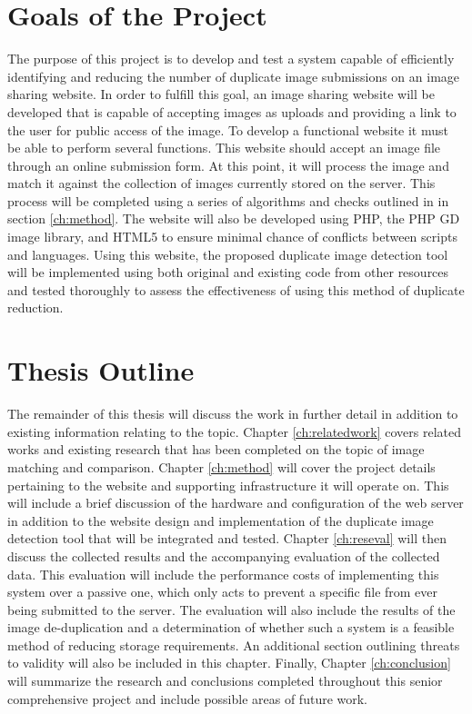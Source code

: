 \section{Goals of the Project}\label{sec:goals}
The purpose of this project is to develop and test a system capable of efficiently identifying and reducing the number of duplicate image submissions on an image sharing website. In order to fulfill this goal, an image sharing website will be developed that is capable of accepting images as uploads and providing a link to the user for public access of the image. To develop a functional website it must be able to perform several functions. This website should accept an image file through an online submission form. At this point, it will process the image and match it against the collection of images currently stored on the server. This process will be completed using a series of algorithms and checks outlined in in section \ref{ch:method}. The website will also be developed using PHP, the PHP GD image library, and HTML5 to ensure minimal chance of conflicts between scripts and languages. Using this website, the proposed duplicate image detection tool will be implemented using both original and existing code from other resources and tested thoroughly to assess the effectiveness of using this method of duplicate reduction.

\section{Thesis Outline}\label{sec:outline}
The remainder of this thesis will discuss the work in further detail in addition to existing information relating to the topic. Chapter \ref{ch:relatedwork} covers related works and existing research that has been completed on the topic of image matching and comparison. Chapter \ref{ch:method} will cover the project details pertaining to the website and supporting infrastructure it will operate on. This will include a brief discussion of the hardware and configuration of the web server in addition to the website design and implementation of the duplicate image detection tool that will be integrated and tested. Chapter \ref{ch:reseval} will then discuss the collected results and the accompanying evaluation of the collected data. This evaluation will include the performance costs of implementing this system over a passive one, which only acts to prevent a specific file from ever being submitted to the server. The evaluation will also include the results of the image de-duplication and a determination of whether such a system is a feasible method of reducing storage requirements. An additional section outlining threats to validity will also be included in this chapter. Finally, Chapter \ref{ch:conclusion} will summarize the research and conclusions completed throughout this senior comprehensive project and include possible areas of future work.